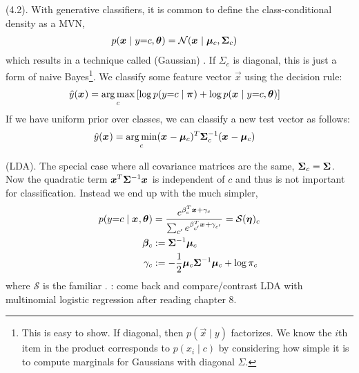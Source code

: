 \documentclass[11pt]{article}
\begin{document}
\myspace
\p {} (4.2). With generative classifiers, it is common to define the class-conditional density as a MVN,
\begin{align}
	p(\vec x \mid y{=}c, \vec\theta) 
		&= \mathcal{N}(\vec x \mid \vec[c]{\mu}, \matr[c]{\Sigma})
\end{align}
which results in a technique called (Gaussian) . If $\Sigma_c$ is diagonal, this is just a form of naive Bayes\footnote{This is easy to show. If diagonal, then $p(\vec x \mid y)$ factorizes. We know the $i$th item in the product corresponds to $p(x_i \mid c)$ by considering how simple it is to compute marginals for Gaussians with diagonal $\Sigma$.}. We classify some feature vector $\vec x$ using the decision rule:
\begin{align}
	\hat{y}(\vec x)
		&= \argmax_c \left[ \log p(y{=}c \mid \vec\pi) + \log p(\vec x \mid y{=}c, \vec\theta ) \right]
\end{align}
If we have uniform prior over classes, we can classify a new test vector as follows:
\begin{align}
	\hat{y}(\vec x) 
		&= \argmin_c (\vec x - \vec[c]{\mu})^T \matr[c]{\Sigma}^{-1} (\vec x - \vec[c]{\mu})
\end{align}

\myspace
\p {} (LDA). The special case where all covariance matrices are the same, $\matr[c]{\Sigma} = \matr\Sigma$. Now the quadratic term $\vec{x}^T \minv{\Sigma} \vec x$ is independent of $c$ and thus is not important for classification. Instead we end up with the much simpler,
\begin{align}
	p(y{=}c \mid \vec x, \vec\theta)
		&= \frac{ e^{\beta_c^T \vec x + \gamma_c} }{  \sum_{c'} e^{\beta_{c'}^T \vec x + \gamma_{c'}  } }
		= \mathcal{S}(\vec\eta)_c \\
	\vec[c]{\beta}
		&:= \minv{\Sigma} \vec[c]{\mu} \\
	\gamma_c
		&:= - \onehalf \vec[c]{\mu}\minv{\Sigma} \vec[c]{\mu} + \log \pi_c 
\end{align}
where $\mathcal{S}$ is the familiar . : come back and compare/contrast LDA with multinomial logistic regression after reading chapter 8. 
\end{document}
